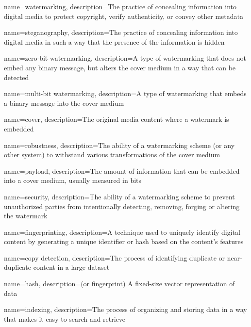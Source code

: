

\makenoidxglossaries

{
    name={watermarking},
    description={The practice of concealing information into digital media to protect copyright, verify authenticity, or convey other metadata}
}

{
    name={steganography},
    description={The practice of concealing information into digital media in such a way that the presence of the information is hidden}
}

{
    name={zero-bit watermarking},
    description={A type of watermarking that does not embed any binary message, but alters the cover medium in a way that can be detected}
}

{
    name={multi-bit watermarking},
    description={A type of watermarking that embeds a binary message into the cover medium}
}

{
    name={cover},
    description={The original media content where a watermark is embedded}
}

{
    name={robustness},
    description={The ability of a watermarking scheme (or any other system) to withstand various transformations of the cover medium}
}

{
    name={payload},
    description={The amount of information that can be embedded into a cover medium, usually measured in bits}
}

{
    name={security},
    description={The ability of a watermarking scheme to prevent unauthorized parties from intentionally detecting, removing, forging or altering the watermark}
}

{
    name={fingerprinting},
    description={A technique used to uniquely identify digital content by generating a unique identifier or hash based on the content's features}
}

{
    name={copy detection},
    description={The process of identifying duplicate or near-duplicate content in a large dataset}
}

{
    name={hash},
    description={(or fingerprint) A fixed-size vector representation of data}
}

{
    name={indexing},
    description={The process of organizing and storing data in a way that makes it easy to search and retrieve}
}

